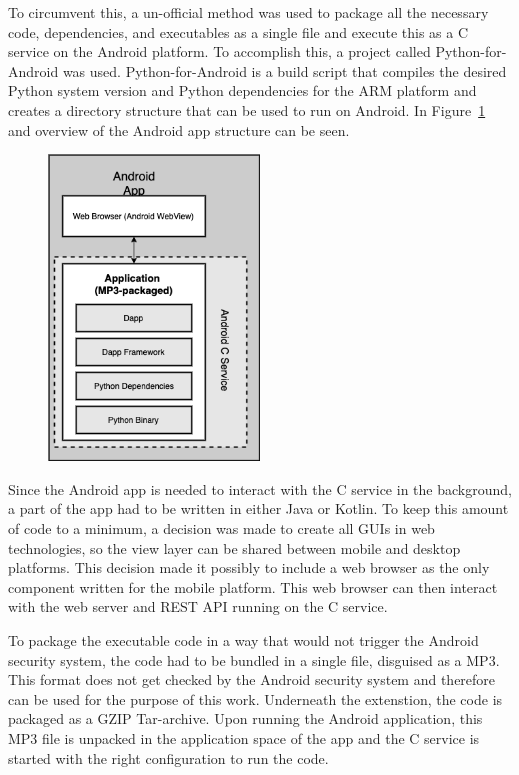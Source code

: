 To circumvent this, a un-official method was used to package all the necessary code, dependencies, and executables as a single file and execute this as a C service on the Android platform. To accomplish this, a project called Python-for-Android was used. Python-for-Android is a build script that compiles the desired Python system version and Python dependencies for the ARM platform and creates a directory structure that can be used to run on Android. In Figure~\ref{fig:android-architecture} and overview of the Android app structure can be seen.

\begin{figure}[h!]
	\centering
	\includegraphics[width=0.5\textwidth]{images/android-app.png}
	\caption{\label{fig:android-architecture}}
\end{figure}

Since the Android app is needed to interact with the C service in the background, a part of the app had to be written in either Java or Kotlin. To keep this amount of code to a minimum, a decision was made to create all GUIs in web technologies, so the view layer can be shared between mobile and desktop platforms. This decision made it possibly to include a web browser as the only component written for the mobile platform. This web browser can then interact with the web server and REST API running on the C service.

To package the executable code in a way that would not trigger the Android security system, the code had to be bundled in a single file, disguised as a MP3. This format does not get checked by the Android security system  and therefore can be used for the purpose of this work. Underneath the extenstion, the code is packaged as a GZIP Tar-archive. Upon running the Android application, this MP3 file is unpacked in the application space of the app and the C service is started with the right configuration to run the code.

